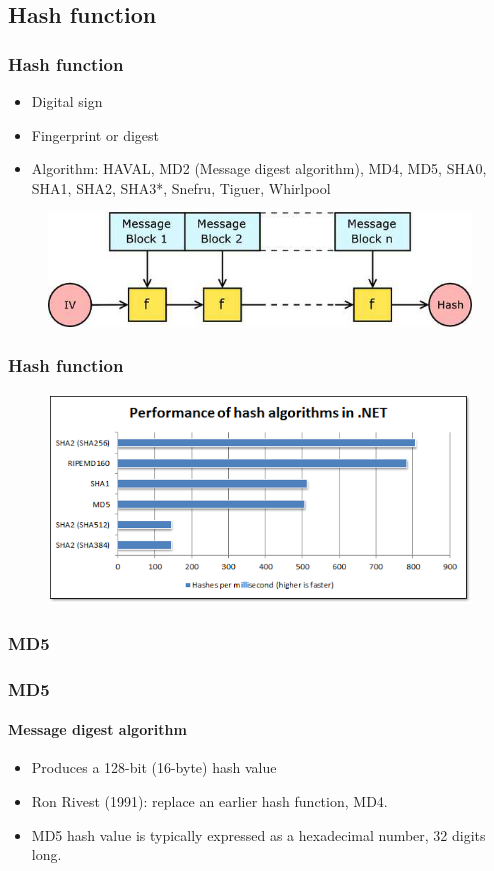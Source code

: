 \documentclass{beamer}
\begin{document}
\subsection{Hash function}
\begin{frame}
\frametitle{Hash function}
\begin{itemize}
\item Digital sign
\item Fingerprint or digest
\item Algorithm: HAVAL, MD2 (Message digest algorithm), MD4, MD5, SHA0, SHA1, SHA2, SHA3*, Snefru, Tiguer, Whirlpool 
\end{itemize}
\begin{figure}
\includegraphics[width=0.6\linewidth]{hash.png}
\end{figure}
\end{frame}

\begin{frame}
\frametitle{Hash function}
\begin{figure}
\includegraphics[width=0.9\linewidth]{comp.png}
\end{figure}
\end{frame}

\subsubsection{MD5}

\begin{frame}
\frametitle{MD5}
\framesubtitle{Message digest algorithm}
\begin{itemize}
\item Produces a 128-bit (16-byte) hash value
\item Ron Rivest (1991): replace an earlier hash function, MD4.
\item MD5 hash value is typically expressed as a hexadecimal number, 32 digits long.
\end{itemize}
\end{frame}
\end{document}
